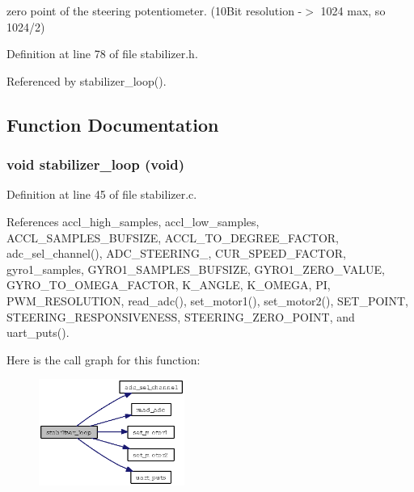 zero point of the steering potentiometer. (10Bit resolution -$>$ 1024 max, so 1024/2) 

Definition at line 78 of file stabilizer.h.

Referenced by stabilizer\_\-loop().

\subsection{Function Documentation}
\subsubsection{\setlength{\rightskip}{0pt plus 5cm}void stabilizer\_\-loop (void)}\label{stabilizer_8h_cc3a7bb7e4532b65fe366e14f3778f86}




Definition at line 45 of file stabilizer.c.

References accl\_\-high\_\-samples, accl\_\-low\_\-samples, ACCL\_\-SAMPLES\_\-BUFSIZE, ACCL\_\-TO\_\-DEGREE\_\-FACTOR, adc\_\-sel\_\-channel(), ADC\_\-STEERING\_, CUR\_\-SPEED\_\-FACTOR, gyro1\_\-samples, GYRO1\_\-SAMPLES\_\-BUFSIZE, GYRO1\_\-ZERO\_\-VALUE, GYRO\_\-TO\_\-OMEGA\_\-FACTOR, K\_\-ANGLE, K\_\-OMEGA, PI, PWM\_\-RESOLUTION, read\_\-adc(), set\_\-motor1(), set\_\-motor2(), SET\_\-POINT, STEERING\_\-RESPONSIVENESS, STEERING\_\-ZERO\_\-POINT, and uart\_\-puts().

Here is the call graph for this function:\begin{figure}[H]
\begin{center}
\leavevmode
\includegraphics[width=135pt]{stabilizer_8h_cc3a7bb7e4532b65fe366e14f3778f86_cgraph}
\end{center}
\end{figure}
